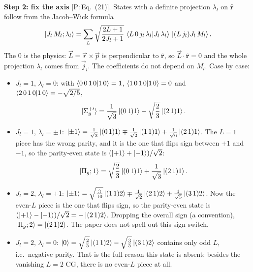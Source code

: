 \documentclass[11pt,a4paper]{article}
\newcommand{\tagP}[1]{\textcolor{blue!65!black}{\textsf{\small[P:\,#1]}}}
\newenvironment{aiadd}{\par}{\par}
\begin{document}
\begin{aiadd}
	\textbf{Step 2: fix the axis} \tagP{Eq.~(21)}. States with a definite projection $\lambda_l$ on $\hat{\bm r}$ follow from the Jacob--Wick formula
	\[
		\ket{J_l\,M_l;\lambda_l}=\sum_L\sqrt{\frac{2L+1}{2J_l+1}}\,\braket{L\,0\,j_l\,\lambda_l|J_l\,\lambda_l}\,\ket{(L\,j_l)J_l\,M_l}.
	\]
	The $0$ is the physics: $\vec L=\vec r\times\vec p$ is perpendicular to $\hat{\bm r}$, so $\vec L\cdot\hat{\bm r}=0$ and the whole projection $\lambda_l$ comes from $\vec j_l$. The coefficients do not depend on $M_l$. Case by case:
	\begin{itemize}
		\item $J_l=1$, $\lambda_l=0$: with $\braket{0\,0\,1\,0|1\,0}=1$, $\braket{1\,0\,1\,0|1\,0}=0$ and $\braket{2\,0\,1\,0|1\,0}=-\sqrt{2/5}$,
		      \[
			      \ket{\Sigma_g^{+\prime}}=\frac{1}{\sqrt3}\ket{(0\,1)1}-\sqrt{\frac23}\ket{(2\,1)1}.
		      \]
		\item $J_l=1$, $\lambda_l=\pm1$: $\ket{\pm1}=\frac{1}{\sqrt3}\ket{(0\,1)1}\mp\frac{1}{\sqrt2}\ket{(1\,1)1}+\frac{1}{\sqrt6}\ket{(2\,1)1}$. The $L=1$ piece has the wrong parity, and it is the one that flips sign between $+1$ and $-1$, so the parity-even state is $(\ket{+1}+\ket{-1})/\sqrt2$:
		      \[
			      \ket{\Pi_g;1}=\sqrt{\frac23}\ket{(0\,1)1}+\frac{1}{\sqrt3}\ket{(2\,1)1}.
		      \]
		\item $J_l=2$, $\lambda_l=\pm1$: $\ket{\pm1}=\sqrt{\frac{3}{10}}\ket{(1\,1)2}\mp\frac{1}{\sqrt2}\ket{(2\,1)2}+\frac{1}{\sqrt5}\ket{(3\,1)2}$. Now the even-$L$ piece is the one that flips sign, so the parity-even state is $(\ket{+1}-\ket{-1})/\sqrt2=-\ket{(2\,1)2}$. Dropping the overall sign (a convention), $\ket{\Pi_g;2}=\ket{(2\,1)2}$. The paper does not spell out this sign switch.
		\item $J_l=2$, $\lambda_l=0$: $\ket{0}=\sqrt{\frac25}\ket{(1\,1)2}-\sqrt{\frac35}\ket{(3\,1)2}$ contains only odd $L$, i.e.\ negative parity. That is the full reason this state is absent: besides the vanishing $L=2$ CG, there is no even-$L$ piece at all.
	\end{itemize}


\end{aiadd}
\end{document}

